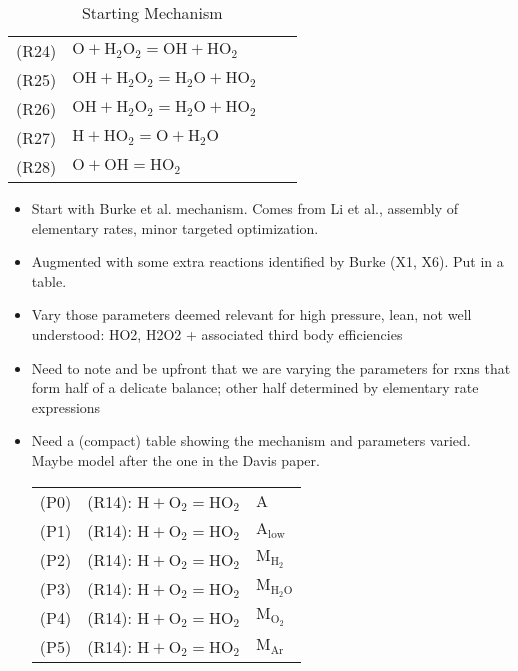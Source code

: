 \documentclass[preprint,3p,times,twocolumn]{elsarticle}
\begin{document}
\begin{table}[htp]
\begin{tabular}{l l l l}
(R24)&$ \mathrm{O} + \mathrm{H}_2\mathrm{O}_2 = \mathrm{OH} + \mathrm{HO}_2$\\
(R25)&$ \mathrm{OH} + \mathrm{H}_2\mathrm{O}_2 = \mathrm{H}_2\mathrm{O} + \mathrm{HO}_2$\\
(R26)&$ \mathrm{OH} + \mathrm{H}_2\mathrm{O}_2 = \mathrm{H}_2\mathrm{O} + \mathrm{HO}_2$\\
(R27)&$ \mathrm{H} + \mathrm{HO}_2 = \mathrm{O} + \mathrm{H}_2\mathrm{O}$\\
(R28)&$ \mathrm{O} + \mathrm{OH} = \mathrm{HO}_2$\\
\hline
  \end{tabular}
  \caption{Starting Mechanism}
  \label{tab:srcmech}
\end{table}
\begin{itemize}
\item Start with Burke et al. mechanism. Comes from Li et al.,
  assembly of elementary rates, minor targeted optimization.
\item Augmented with some extra reactions identified by Burke (X1,
  X6). Put in a table.
\item Vary those parameters deemed relevant for high pressure, lean,
  not well understood: HO2, H2O2 + associated third body efficiencies
\item Need to note and be upfront that we are varying the parameters
  for rxns that form half of a delicate balance; other half determined
  by elementary rate expressions
\item Need a (compact) table showing the mechanism and parameters
  varied. Maybe model after the one in the Davis paper.
  \begin{table}[htp]
    \centering
    \begin{tabular}{l l l}
      \hline
(P0)& (R14): $ \mathrm{H} + \mathrm{O}_2 = \mathrm{HO}_2     $&$ \mathrm{A}$\\
(P1)& (R14): $ \mathrm{H} + \mathrm{O}_2 = \mathrm{HO}_2     $&$ \mathrm{A}_\mathrm{low}$\\
(P2)& (R14): $ \mathrm{H} + \mathrm{O}_2 = \mathrm{HO}_2     $&$ \mathrm{M}_{\mathrm{H}_2}$\\
(P3)& (R14): $ \mathrm{H} + \mathrm{O}_2 = \mathrm{HO}_2     $&$ \mathrm{M}_{\mathrm{H}_2\mathrm{O}}$\\
(P4)& (R14): $ \mathrm{H} + \mathrm{O}_2 = \mathrm{HO}_2     $&$ \mathrm{M}_{\mathrm{O}_2}$\\
(P5)& (R14): $ \mathrm{H} + \mathrm{O}_2 = \mathrm{HO}_2     $&$ \mathrm{M}_{\mathrm{Ar}}$\\

\end{tabular}
\end{table}
\end{itemize}
\end{document}
